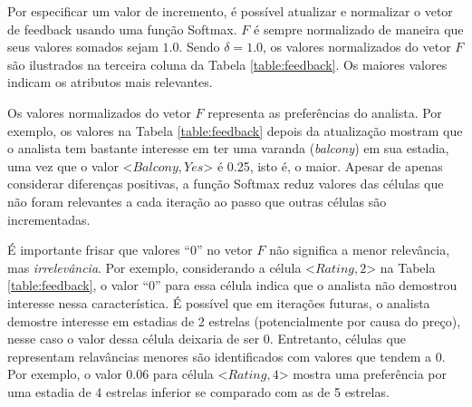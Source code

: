 Por especificar um valor de incremento, é possível atualizar e normalizar o vetor de feedback usando uma função Softmax. $F$ é sempre normalizado de maneira que seus valores somados sejam $1.0$. Sendo $\delta = 1.0$, os valores normalizados do vetor $F$ são ilustrados na terceira coluna da Tabela \ref{table:feedback}. Os maiores valores indicam os atributos mais relevantes.

Os valores normalizados do vetor $F$ representa as preferências do analista. Por exemplo, os valores na Tabela \ref{table:feedback} depois da atualização mostram que o analista tem bastante interesse em ter uma varanda ({\em balcony}) em sua estadia, uma vez que o valor \textless{}$Balcony, Yes$\textgreater{} é 0.25, isto é, o maior. Apesar de apenas considerar diferenças positivas, a função Softmax reduz valores das células que não foram relevantes a cada iteração ao passo que outras células são incrementadas.

É importante frisar que valores ``0'' no vetor $F$ não significa a menor relevância, mas {\em irrelevância}. Por exemplo, considerando a célula \textless{}$Rating, 2$\textgreater{} na Tabela \ref{table:feedback}, o valor ``0'' para essa célula indica que o analista não demostrou interesse nessa característica. É possível que em iterações futuras, o analista demostre interesse em estadias de 2 estrelas (potencialmente por causa do preço), nesse caso o valor dessa célula deixaria de ser 0. Entretanto, células que representam relavâncias menores são identificados com valores que tendem a 0. Por exemplo, o valor 0.06 para célula \textless{}$Rating, 4$\textgreater{} mostra uma preferência por uma estadia de 4 estrelas inferior se comparado com as de 5 estrelas.

